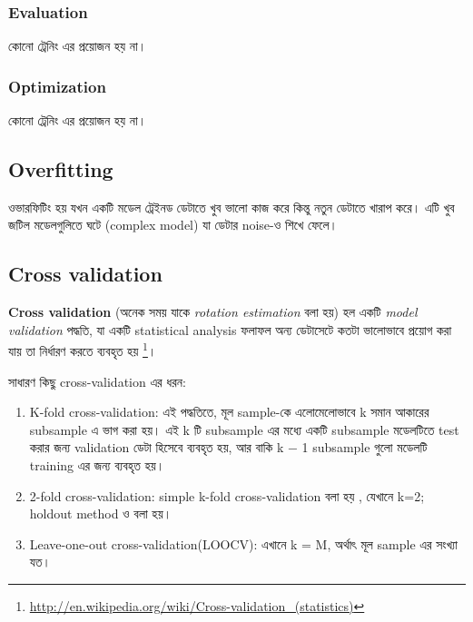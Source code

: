 \documentclass[graybox, envcountchap, twocolumn]{styles/svmult}
\begin{document}
\begin{enumerate}

\subsubsection{Evaluation}
কোনো ট্রেনিং এর প্রয়োজন হয় না। 

\subsubsection{Optimization}
কোনো ট্রেনিং এর প্রয়োজন হয় না। 


\subsection{Overfitting}

ওভারফিটিং হয় যখন একটি মডেল ট্রেইনড ডেটাতে খুব ভালো কাজ করে কিন্তু নতুন ডেটাতে খারাপ করে। এটি খুব জটিল মডেলগুলিতে ঘটে (complex model) যা ডেটার noise-ও শিখে ফেলে।



\subsection{Cross validation}
\label{sec:Cross-validation}
\begin{definition}
\textbf{Cross validation} {\bengalifont (অনেক সময় যাকে \emph{rotation estimation} বলা হয়) হল একটি \emph{model validation} পদ্ধতি, যা একটি statistical analysis ফলাফল অন্য ডেটাসেটে কতটা ভালোভাবে প্রয়োগ করা যায় তা নির্ধারণ করতে ব্যবহৃত হয় \footnote{\url{http://en.wikipedia.org/wiki/Cross-validation_(statistics)}}।}
\end{definition}

{\bengalifont সাধারণ কিছু cross-validation এর ধরন:}
\begin{enumerate}
\item  K-fold cross-validation: {\bengalifont এই পদ্ধতিতে, মূল sample-কে এলোমেলোভাবে k সমান আকারের subsample এ ভাগ করা হয়। এই k টি subsample এর মধ্যে একটি subsample মডেলটিতে test করার জন্য validation ডেটা হিসেবে ব্যবহৃত হয়, আর বাকি k − 1 subsample গুলো মডেলটি training এর জন্য ব্যবহৃত হয়।}
\item  2-fold cross-validation: {\bengalifont simple k-fold cross-validation বলা হয় , যেখানে k=2; holdout method ও বলা হয়।}
\item {\bengalifont Leave-one-out cross-validation(LOOCV)}: এখানে k = M, অর্থাৎ মূল sample এর সংখ্যা যত।
\end{enumerate}


\end{enumerate}
\end{document}
